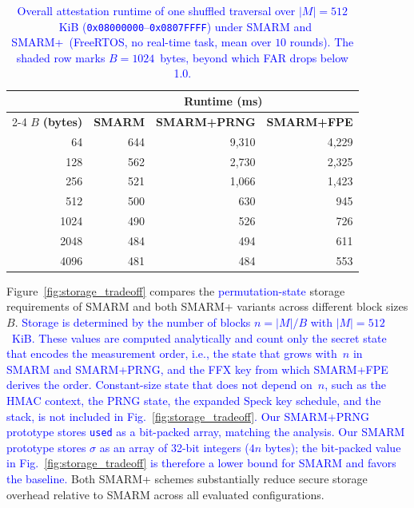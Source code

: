 \documentclass[journal]{IEEEtran}
\newcommand\ben[1]{\textcolor{blue}{#1}}
\newcommand{\rtsmarm}{SMARM+\xspace}
\newcommand{\rtsmarmone}{SMARM+PRNG\xspace}
\newcommand{\rtsmarmtwo}{SMARM+FPE\xspace}
\begin{document}
\begin{table}[!ht]
  \centering
  \small
  \setlength{\tabcolsep}{6pt}
  \begin{tabular}{rrrr}
    \toprule
    & \multicolumn{3}{c}{\textbf{Runtime (ms)}} \\
    \cmidrule(lr){2-4}
    $B$ \textbf{(bytes)} 
    & \textbf{SMARM} 
    & \textbf{\rtsmarmone} 
    & \textbf{\rtsmarmtwo} \\
    \midrule
    64    & 644 & 9{,}310 & 4{,}229 \\
    128   & 562 & 2{,}730 & 2{,}325 \\
    256   & 521 & 1{,}066 & 1{,}423 \\
    512   & 500 &   630   &   945   \\
    \rowcolor{gray!15}
    1024  & 490 &   526   &   726   \\
    2048  & 484 &   494   &   611   \\
    4096  & 481 &   484   &   553   \\
    \bottomrule
  \end{tabular}
    \caption{\ben{Overall attestation runtime of one shuffled traversal over $|M| = 512$~KiB (\texttt{0x08000000}--\texttt{0x0807FFFF}) under SMARM and \rtsmarm\ (FreeRTOS, no real-time task, mean over $10$ rounds). The shaded row marks $B = 1024$~bytes, beyond which FAR drops below 1.0.}}

  \label{tab:runtime_overhead}
\end{table}

Figure~\ref{fig:storage_tradeoff} compares the \ben{permutation-state} storage requirements of SMARM and both \rtsmarm variants across different block sizes $B$.
\ben{Storage is determined by the number of blocks $n = |M|/B$ with $|M| = 512$~KiB.
These values are computed analytically and count only the secret state that encodes the measurement order, i.e., the state that grows with~$n$ in SMARM and \rtsmarmone, and the FFX key from which \rtsmarmtwo derives the order.
Constant-size state that does not depend on~$n$, such as the HMAC context, the PRNG state, the expanded Speck key schedule, and the stack, is not included in Fig.~\ref{fig:storage_tradeoff}.
Our \rtsmarmone prototype stores \texttt{used} as a bit-packed array, matching the analysis.
Our SMARM prototype stores $\sigma$ as an array of 32-bit integers ($4n$ bytes); the bit-packed value in Fig.~\ref{fig:storage_tradeoff} is therefore a lower bound for SMARM and favors the baseline.}
Both \rtsmarm schemes substantially reduce secure storage overhead relative to SMARM across all evaluated configurations.
\end{document}
